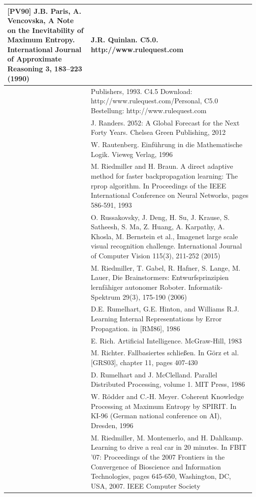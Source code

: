 \documentclass[10pt]{book}
\begin{document}
\begin{center}
\begin{tabular}{|l|l|}
[PV90] J.B. Paris, A. Vencovska, A Note on the Inevitability of Maximum Entropy. International Journal of Approximate Reasoning 3, 183--223 (1990)
 & J.R. Quinlan. C5.0. http://www.rulequest.com \\
\hline [Qui93] & Publishers, 1993. C4.5 Download: http://www.rulequest.com/Personal, C5.0 Bestellung: http://www.rulequest.com \\
\hline [Ran12] & J. Randers. 2052: A Global Forecast for the Next Forty Years. Chelsea Green Publishing, 2012 \\
\hline [\cite{rau96}] & W. Rautenberg. Einführung in die Mathematische Logik. Vieweg Verlag, 1996 \\
\hline [RB93] & M. Riedmiller and H. Braun. A direct adaptive method for faster backpropagation learning: The rprop algorithm. In Proceedings of the IEEE International Conference on Neural Networks, pages 586-591, 1993 \\
\hline [RDS+15] & O. Russakovsky, J. Deng, H. Su, J. Krause, S. Satheesh, S. Ma, Z. Huang, A. Karpathy, A. Khosla, M. Bernstein et al., Imagenet large scale visual recognition challenge. International Journal of Computer Vision 115(3), 211-252 (2015) \\
\hline [RGH+06] & M. Riedmiller, T. Gabel, R. Hafner, S. Lange, M. Lauer, Die Brainstormers: Entwurfsprinzipien lernfähiger autonomer Roboter. Informatik-Spektrum 29(3), 175-190 (2006) \\
\hline [RHR86] & D.E. Rumelhart, G.E. Hinton, and Williams R.J. Learning Internal Representations by Error Propagation. in [RM86], 1986 \\
\hline [Ric83] & E. Rich. Artificial Intelligence. McGraw-Hill, 1983 \\
\hline [\cite{ric03}] & M. Richter. Fallbasiertes schließen. In Görz et al. [GRS03], chapter 11, pages 407-430 \\
\hline [RM86] & D. Rumelhart and J. McClelland. Parallel Distributed Processing, volume 1. MIT Press, 1986 \\
\hline [RM96] & W. Rödder and C.-H. Meyer. Coherent Knowledge Processing at Maximum Entropy by SPIRIT. In KI-96 (German national conference on AI), Dresden, 1996 \\
\hline [RMD07] & M. Riedmiller, M. Montemerlo, and H. Dahlkamp. Learning to drive a real car in 20 minutes. In FBIT '07: Proceedings of the 2007 Frontiers in the Convergence of Bioscience and Information Technologies, pages 645-650, Washington, DC, USA, 2007. IEEE Computer Society \\

\end{tabular}
\end{center}
\end{document}
